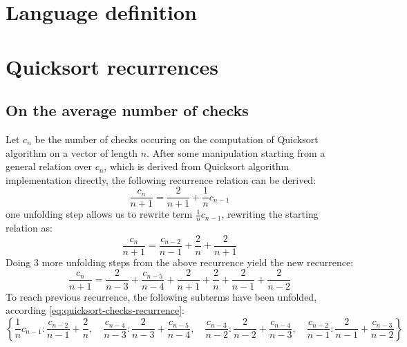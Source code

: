 \documentclass[a4paper,dottedtoc,headinclude,footinclude]{report} %
\theoremstyle{plain}
\begin{document}
    \tableofcontents
    
    \chapter{Language definition}
    \lipsum[1]

    \chapter{Quicksort recurrences}

    \section{On the average number of checks}

    Let $c_{n}$ be the number of checks occuring on the computation
    of Quicksort algorithm on a vector of length $n$. After some manipulation
    starting from a general relation over $c_{n}$, which is derived from
    Quicksort algorithm implementation directly, the following
    recurrence relation can be derived:
    \begin{equation}
        \label{eq:quicksort-checks-recurrence}
        \frac{c_{n}}{n + 1} = \frac{2}{n + 1} + \frac{1}{n} c_{n - 1}
    \end{equation}
    one unfolding step allows us to rewrite term $\frac{1}{n} c_{n - 1}$, 
    rewriting the starting relation as:
    \begin{displaymath}
        \frac{c_{n}}{n + 1} = \frac{c_{n - 2}}{n - 1} + \frac{2}{n} + \frac{2}{n + 1}
    \end{displaymath}
    Doing $3$ more unfolding steps from the above recurrence yield the
    new recurrence:
    \begin{displaymath}
        \frac{c_{n}}{n + 1} = \frac{2}{n - 3} + \frac{c_{n - 5}}{n - 4} + \frac{2}{n + 1} + \frac{2}{n} + \frac{2}{n - 1} + \frac{2}{n - 2}
    \end{displaymath}
    To reach previous recurrence, the following subterms have been unfolded,
    according \autoref{eq:quicksort-checks-recurrence}:
    \begin{displaymath}
        \left \{ \frac{1}{n} c_{n - 1} : \frac{c_{n - 2}}{n - 1} + \frac{2}{n}, \quad \frac{c_{n - 4}}{n - 3} : \frac{2}{n - 3} + \frac{c_{n - 5}}{n - 4}, \quad \frac{c_{n - 3}}{n - 2} : \frac{2}{n - 2} + \frac{c_{n - 4}}{n - 3}, \quad \frac{c_{n - 2}}{n - 1} : \frac{2}{n - 1} + \frac{c_{n - 3}}{n - 2}\right \}
    \end{displaymath}
    
\end{document}
